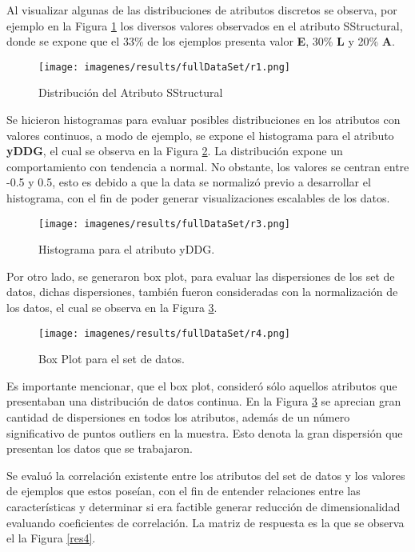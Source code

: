 Al visualizar algunas de las distribuciones de atributos discretos se observa, por ejemplo en la Figura \ref{res1} los diversos valores observados en el atributo SStructural, donde se expone que el 33\% de los ejemplos presenta valor \textbf{E}, 30\% \textbf{L} y 20\% \textbf{A}. 

\begin{figure}[!h]
	\centering
	\texttt{[image: imagenes/results/fullDataSet/r1.png]}
	\caption{Distribuci\'on del Atributo SStructural}
	\label{res1}
\end{figure}

Se hicieron histogramas para evaluar posibles distribuciones en los atributos con valores continuos, a modo de ejemplo, se expone el histograma para el atributo \textbf{yDDG}, el cual se observa en la Figura \ref{res2}. La distribuci\'on expone un comportamiento 
con tendencia a normal. No obstante, los valores se centran entre -0.5 y 0.5, esto es debido a que la data se normaliz\'o previo a desarrollar el histograma, con el fin de poder generar visualizaciones escalables de los datos.

\begin{figure}[!h]
	\centering
	\texttt{[image: imagenes/results/fullDataSet/r3.png]}
	\caption{Histograma para el atributo yDDG.}
	\label{res2}
\end{figure}

Por otro lado, se generaron box plot, para evaluar las dispersiones de los set de datos, dichas dispersiones, tambi\'en fueron consideradas con la normalizaci\'on de los datos, el cual se observa en la Figura \ref{res3}. 

\begin{figure}[!h]
	\centering
	\texttt{[image: imagenes/results/fullDataSet/r4.png]}
	\caption{Box Plot para el set de datos.}
	\label{res3}
\end{figure}

Es importante mencionar, que el box plot, consider\'o s\'olo aquellos atributos que presentaban una distribuci\'on de datos continua. En la Figura \ref{res3} se aprecian gran cantidad de dispersiones en todos los atributos, adem\'as de un n\'umero significativo de puntos outliers en la muestra. Esto denota la gran dispersi\'on que presentan los datos que se trabajaron.

Se evalu\'o la correlaci\'on existente entre los atributos del set de datos y los valores de ejemplos que estos pose\'ian, con el fin de entender relaciones entre las caracter\'isticas y determinar si era factible generar reducci\'on de dimensionalidad evaluando coeficientes de correlaci\'on. La matriz de respuesta es la que se observa el la Figura \ref{res4}. 

